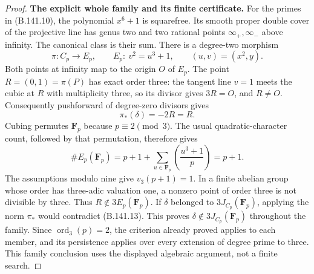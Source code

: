 \begin{proof}
\medskip\noindent\textbf{The explicit whole family and its finite certificate.}
For the primes in (B.141.10), the polynomial $x^6+1$ is squarefree.
Its smooth proper double cover of the projective line has genus
two and two rational points $\infty_+,\infty_-$ above infinity.
The canonical class is their sum.
There is a degree-two morphism
\[
 \pi:C_p\longrightarrow E_p,\qquad
 E_p:\ v^2=u^3+1,\qquad (u,v)=(x^2,y).
                                                            \tag{B.141.12}
\]
Both points at infinity map to the origin $O$ of $E_p$.
The point $R=(0,1)=\pi(P)$ has exact order three:
the tangent line $v=1$ meets the cubic at $R$ with multiplicity
three, so its divisor gives $3R=O$, and $R\ne O$.
Consequently pushforward of degree-zero divisors gives
\[
                         \pi_*(\delta)=-2R=R.
                                                            \tag{B.141.13}
\]
Cubing permutes $\mathbf F_p$ because $p\equiv2\pmod3$.
The usual quadratic-character count, followed by that permutation,
therefore gives
\[
 \#E_p(\mathbf F_p)
   =p+1+\sum_{u\in\mathbf F_p}
                  \left(\frac{u^3+1}{p}\right)
   =p+1 .
\]
The assumptions modulo nine give $v_3(p+1)=1$.
In a finite abelian group whose order has three-adic valuation one,
a nonzero point of order three is not divisible by three.
Thus $R\notin3E_p(\mathbf F_p)$.
If $\delta$ belonged to $3J_{C_p}(\mathbf F_p)$, applying the norm
$\pi_*$ would contradict (B.141.13).
This proves $\delta\notin3J_{C_p}(\mathbf F_p)$ throughout the
family.  Since $\operatorname{ord}_3(p)=2$, the criterion already
proved applies to each member, and its persistence applies over
every extension of degree prime to three.
This family conclusion uses the displayed algebraic argument,
not a finite search.


\end{proof}
